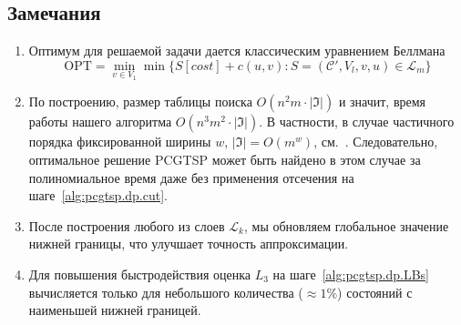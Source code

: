 \subsection{Замечания}

\begin{enumerate}
  \item
  Оптимум для решаемой задачи дается классическим уравнением Беллмана
  \[
    \mathrm{OPT}=\min_{v\in V_1}\min\{S[cost]+c(u,v)\colon S=(\mathcal C',V_l, v, u)\in\mathcal L_m\}
  \]
  \item
  По построению,
  размер таблицы поиска
  $O(n^2m\cdot |\mathfrak I|)$
  и значит, время работы нашего алгоритма
  $O(n^3m^2\cdot |\mathfrak I|)$.
  В частности,
  в случае частичного порядка фиксированной ширины
  $w$, $|\mathfrak I|=O(m^w)$,
  см.~\cite{Steiner-1990}.
  Следовательно,
  оптимальное решение
  PCGTSP
  может быть найдено в этом случае за полиномиальное время
  даже без применения отсечения на шаге~\ref{alg:pcgtsp.dp.cut}.

  \item
  После построения любого из слоев
  $\mathcal L_k$,
  мы обновляем глобальное значение нижней границы,
  что улучшает точность аппроксимации.

  \item
  Для повышения быстродействия
  оценка $L_3$
  на шаге~\ref{alg:pcgtsp.dp.LBs}
  вычисляется
  только для небольшого количества
  ($\approx 1\%$)
  состояний с наименьшей нижней границей.
\end{enumerate}

